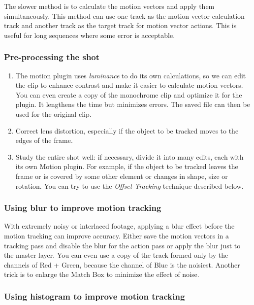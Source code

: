 The slower method is to calculate the motion vectors and apply them simultaneously. This method can use one track as the motion vector calculation track and another track as the target track for motion vector actions. This is useful for long sequences where some error is acceptable.

\subsubsection*{Pre-processing the shot}
\label{ssub:pre_processing_shot}

\begin{enumerate}
    \item The motion plugin uses \textit{luminance} to do its own calculations, so we can edit the clip to enhance contrast and make it easier to calculate motion vectors. You can even create a copy of the monochrome clip and optimize it for the plugin. It lengthens the time but minimizes errors. The saved file can then be used for the original clip.
    \item  Correct lens distortion, especially if the object to be tracked moves to the edges of the frame.
    \item Study the entire shot well: if necessary, divide it into many edits, each with its own Motion plugin. For example, if the object to be tracked leaves the frame or is covered by some other element or changes in shape, size or rotation. You can try to use the \textit{Offset Tracking} technique described below.
\end{enumerate}

\subsubsection*{Using blur to improve motion tracking}
\label{ssub:blur_improve_motion_tracking}

With extremely noisy or interlaced footage, applying a blur effect before the motion tracking can improve accuracy. Either save the motion vectors in a tracking pass and disable the blur for the action pass or apply the blur just to the master layer. You can even use a copy of the track formed only by the channels of Red + Green, because the channel of Blue is the noisiest. Another trick is to enlarge the Match Box to minimize the effect of noise.

\subsubsection*{Using histogram to improve motion tracking}
\label{ssub:histogram_improve_motion_tracking}

